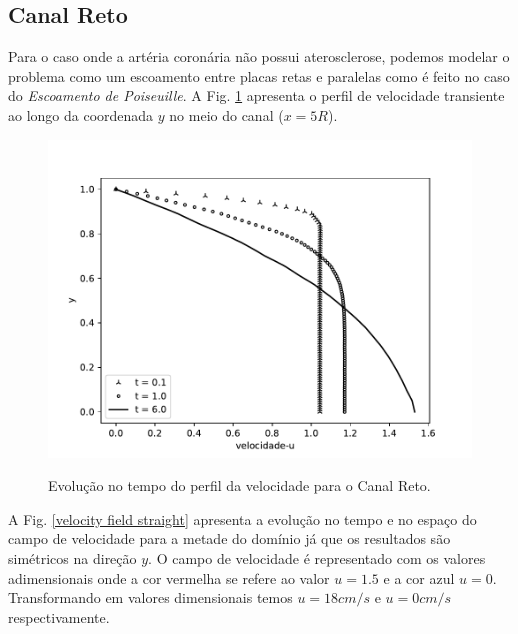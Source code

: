 \subsection{Canal Reto}

Para o caso onde a artéria coronária não possui aterosclerose,
podemos modelar o problema como um escoamento entre placas retas e paralelas
como é feito no caso do \textit{Escoamento de Poiseuille}.
A Fig. \ref{velocity evolution straight} apresenta o perfil
de velocidade transiente ao longo da coordenada $y$ no
meio do canal ($x=5R$). 

\begin{figure}[H]
     \centering
     \includegraphics[scale=1]{cap_solution/figure/vel_Straight_evol.pdf}\\
     \caption{Evolução no tempo do perfil da velocidade para o Canal Reto.}
     \label{velocity evolution straight}
\end{figure}

\medskip
A Fig. \ref{velocity field straight} apresenta a evolução no tempo e no espaço
do campo de velocidade para a metade do domínio já que os resultados são simétricos
na direção $y$. O campo de velocidade é representado com os valores adimensionais
onde a cor vermelha se refere ao valor $u=1.5$ e a cor azul $u=0$. Transformando em
valores dimensionais temos $u=18cm/s$ e $u=0cm/s$ respectivamente.
 
